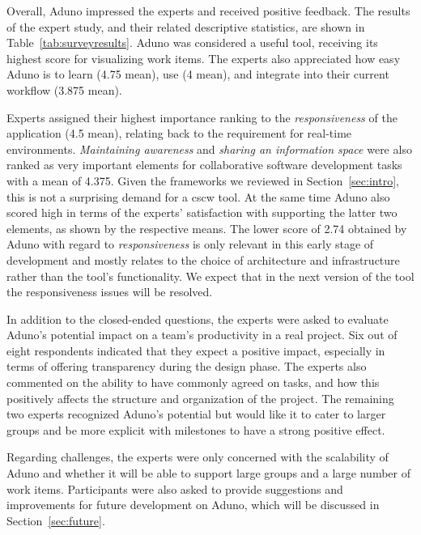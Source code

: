\documentclass[conference]{IEEEtran}
\begin{document}
Overall, Aduno impressed the experts and received positive feedback. The results of the expert study, and their related descriptive statistics, are shown in Table~\ref{tab:surveyresults}. 
Aduno was considered a useful tool, receiving its highest score for visualizing work items. The experts also appreciated how easy Aduno is to learn (4.75 mean), use (4 mean), and integrate into their current workflow (3.875 mean).

Experts assigned their highest importance ranking to the \textit{responsiveness} of the application (4.5 mean), relating back to the requirement for real-time environments. \textit{Maintaining awareness} and \textit{sharing an information space} were also ranked as very important elements for collaborative software development tasks with a mean of 4.375. Given the frameworks we reviewed in Section~\ref{sec:intro}, this is not a surprising demand for a {\sc cscw} tool. At the same time Aduno also scored high in terms of the experts' satisfaction with supporting the latter two elements, as shown by the respective means. The lower score of 2.74 obtained by Aduno with regard to \textit{responsiveness} is only relevant in this early stage of development and mostly relates to the choice of architecture and infrastructure rather than the tool's functionality. We expect that in the next version of the tool the responsiveness issues will be resolved. 


In addition to the closed-ended questions, the experts were asked to evaluate Aduno's potential impact on a team's productivity in a real project. Six out of eight respondents indicated that they expect a positive impact, especially in terms of offering transparency during the design phase. The experts also commented on the ability to have commonly agreed on tasks, and how this positively affects the structure and organization of the project. The remaining two experts recognized Aduno's potential but would like it to cater to larger groups and be more explicit with milestones to have a strong positive effect.

Regarding challenges, the experts were only concerned with the scalability of Aduno and whether it will be able to support large groups and a large number of work items. Participants were also asked to provide suggestions and improvements for future development on Aduno, which will be discussed in Section~\ref{sec:future}.
\end{document}
